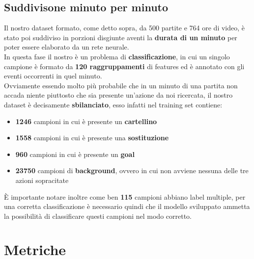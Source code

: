 \subsection{Suddivisone minuto per minuto}
Il nostro dataset formato, come detto sopra, da 500 partite e 764 ore di video, è stato poi suddiviso in porzioni disgiunte aventi la \textbf{durata di un minuto} per poter essere elaborato da un rete neurale.
\\In questa fase il nostro è un problema di \textbf{classificazione}, in cui un singolo campione è formato da \textbf{120 raggruppamenti} di features ed è annotato con gli eventi occorrenti in quel minuto.
\\Ovviamente essendo molto più probabile che in un minuto di una partita non accada niente piuttosto che sia presente un'azione da noi ricercata, il nostro dataset è decisamente \textbf{sbilanciato}, esso infatti nel training set contiene:
\begin{itemize}
\item \textbf{1246} campioni in cui è presente un \textbf{cartellino}
\item \textbf{1558} campioni in cui è presente una \textbf{sostituzione}
\item \textbf{960} campioni in cui è presente un \textbf{goal}
\item \textbf{23750} campioni di \textbf{background}, ovvero in cui non avviene nessuna delle tre azioni sopracitate
\end{itemize}
È importante notare inoltre come ben \textbf{115} campioni abbiano label multiple, per una corretta classificazione è necessario quindi che il modello sviluppato ammetta la possibilità di classificare questi campioni nel modo corretto.
\section{Metriche}

